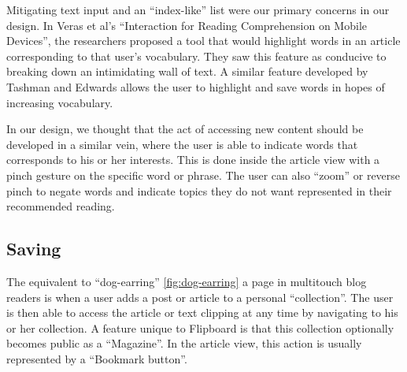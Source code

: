 \documentclass[11pt, oneside]{article}   	%
\begin{document}
Mitigating text input and an ``index-like'' list were our primary concerns in our design. In Veras et al's ``Interaction for Reading Comprehension on Mobile Devices'', the researchers proposed a tool that would highlight words in an article corresponding to that user's vocabulary. They saw this feature as conducive to breaking down an intimidating wall of text. A similar feature developed by Tashman and Edwards allows the user to highlight and save words in hopes of increasing vocabulary.

In our design, we thought that the act of accessing new content  should be developed in a similar vein, where the user is able to indicate words that corresponds to his or her interests. This is done inside the article view with a pinch gesture on the specific word or phrase. The user can also ``zoom'' or reverse pinch to negate words and indicate topics they do not want represented in their recommended reading.

\subsection{Saving}
The equivalent to ``dog-earring'' \ref{fig:dog-earring} a page in multitouch blog readers is when a user adds a post or article to a personal ``collection''. The user is then able to access the article or text clipping at any time by navigating to his or her collection. A feature unique to Flipboard is that this collection optionally becomes public as a ``Magazine''. In the article view, this action is usually represented by a ``Bookmark button''.
\end{document}
